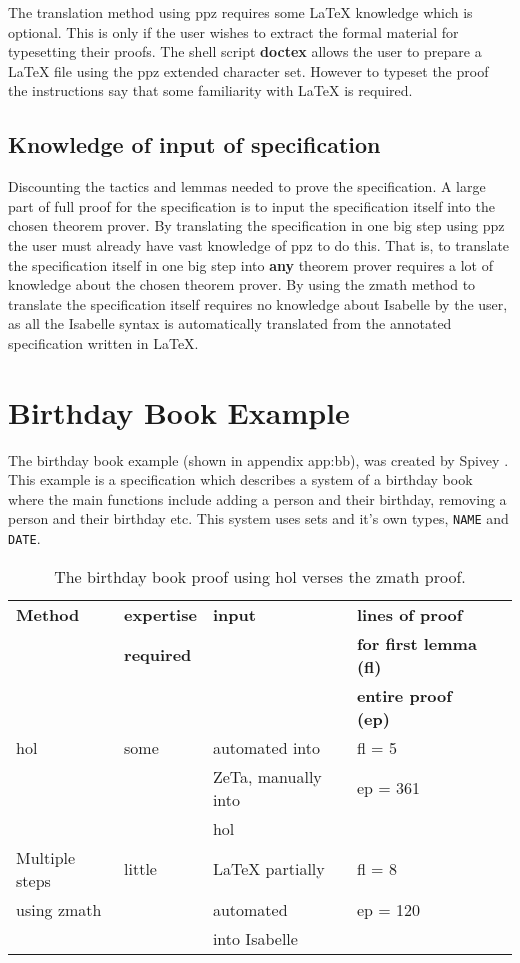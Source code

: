 The translation method using \gls{ppz} requires some \LaTeX{} knowledge which is optional. This is only if the user wishes to extract the formal material for typesetting their proofs. The shell script \textbf{doctex} allows the user to prepare a \LaTeX{} file using the \gls{ppz} extended character set. However to typeset the proof the instructions say that some familiarity with \LaTeX{} is required.

\subsection{Knowledge of input of specification}
Discounting the tactics and lemmas needed to prove the specification. A large part of full proof for the specification is to input the specification itself into the chosen theorem prover. By translating the specification in one big step using \gls{ppz} the user must already have vast knowledge of \gls{ppz} to do this. That is, to translate the specification itself in one big step into \textbf{any} theorem prover requires a lot of knowledge about the chosen theorem prover. By using the \gls{zmath} method to translate the specification itself requires no knowledge about Isabelle by the user, as all the Isabelle syntax is automatically translated from the annotated specification written in \LaTeX{}. 

\section{Birthday Book Example}

The birthday book example (shown in appendix {app:bb}), was created by Spivey \cite{spiveyreferencemanual}. This example is a specification which describes a system of a birthday book where the main functions include adding a person and their birthday, removing a person and their birthday etc. This system uses sets and it's own types, \texttt{NAME} and \texttt{DATE}.

\begin{table}[H]
\begin{center}
\begin{tabular}{| l || l | l | l | l |}
\hline
\textbf{Method} & \textbf{expertise} &  \textbf{input} & \textbf{lines of proof}  \\
& \textbf{required} & & \textbf{for first lemma (fl)}  \\
& & & \textbf{entire proof (ep)} \\
\hline
 \gls{hol} & some  & automated into  & fl = 5  \\
 & & ZeTa, manually into & ep = 361 \\
& & \gls{hol} & \\
\hline
 Multiple steps &  little & \LaTeX{} partially  & fl = 8  \\
using \gls{zmath} & & automated & ep = 120 \\
&  & into Isabelle &  \\
\hline
\end{tabular}
\end{center}
\caption{The birthday book proof using \gls{hol} verses the \gls{zmath} proof.}
\label{tab:comparebb}
\end{table}

